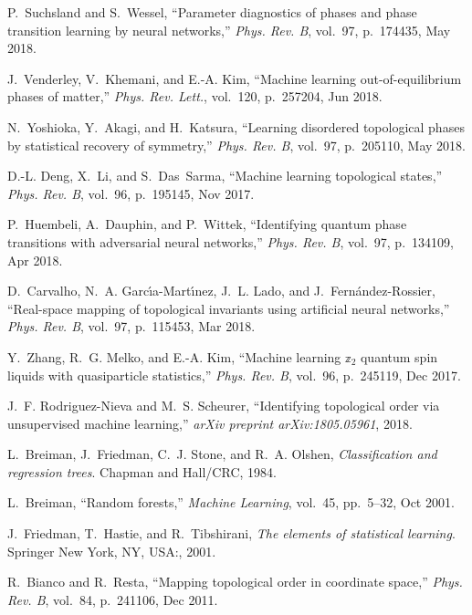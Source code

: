 \documentclass[10pt]{revtex4-1}
\begin{document}
\begin{thebibliography}{10}
P.~Suchsland and S.~Wessel, ``Parameter diagnostics of phases and phase
  transition learning by neural networks,'' {\em Phys. Rev. B}, vol.~97,
  p.~174435, May 2018.

J.~Venderley, V.~Khemani, and E.-A. Kim, ``Machine learning out-of-equilibrium
  phases of matter,'' {\em Phys. Rev. Lett.}, vol.~120, p.~257204, Jun 2018.

N.~Yoshioka, Y.~Akagi, and H.~Katsura, ``Learning disordered topological phases
  by statistical recovery of symmetry,'' {\em Phys. Rev. B}, vol.~97,
  p.~205110, May 2018.

D.-L. Deng, X.~Li, and S.~Das~Sarma, ``Machine learning topological states,''
  {\em Phys. Rev. B}, vol.~96, p.~195145, Nov 2017.

P.~Huembeli, A.~Dauphin, and P.~Wittek, ``Identifying quantum phase transitions
  with adversarial neural networks,'' {\em Phys. Rev. B}, vol.~97, p.~134109,
  Apr 2018.

D.~Carvalho, N.~A. Garc\'{\i}a-Mart\'{\i}nez, J.~L. Lado, and
  J.~Fern\'andez-Rossier, ``Real-space mapping of topological invariants using
  artificial neural networks,'' {\em Phys. Rev. B}, vol.~97, p.~115453, Mar
  2018.

Y.~Zhang, R.~G. Melko, and E.-A. Kim, ``Machine learning ${\mathbb{z}}_{2}$
  quantum spin liquids with quasiparticle statistics,'' {\em Phys. Rev. B},
  vol.~96, p.~245119, Dec 2017.

J.~F. Rodriguez-Nieva and M.~S. Scheurer, ``Identifying topological order via
  unsupervised machine learning,'' {\em arXiv preprint arXiv:1805.05961}, 2018.

L.~Breiman, J.~Friedman, C.~J. Stone, and R.~A. Olshen, {\em Classification and
  regression trees}.
\newblock Chapman and Hall/CRC, 1984.

L.~Breiman, ``Random forests,'' {\em Machine Learning}, vol.~45, pp.~5--32, Oct
  2001.

J.~Friedman, T.~Hastie, and R.~Tibshirani, {\em The elements of statistical
  learning}.
\newblock Springer New York, NY, USA:, 2001.

R.~Bianco and R.~Resta, ``Mapping topological order in coordinate space,'' {\em
  Phys. Rev. B}, vol.~84, p.~241106, Dec 2011.


\end{thebibliography}
\end{document}
